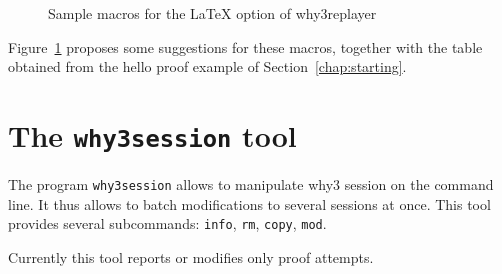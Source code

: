 \begin{figure}[t]
  \begin{center}
    
  \end{center}
  
  \caption{Sample macros for the LaTeX option of why3replayer}
\label{fig:replayer}
\end{figure}

Figure~\ref{fig:replayer} proposes some suggestions for these macros, together
with the table obtained from the hello proof example of Section~\ref{chap:starting}.

\section{The \texttt{why3session} tool}
\label{sec:why3session}

The program \texttt{why3session} allows to manipulate why3 session on
the command line. It thus allows to batch modifications to several
sessions at once. This tool provides several subcommands:
\texttt{info}, \texttt{rm}, \texttt{copy}, \texttt{mod}.

Currently this tool reports or modifies only proof attempts.

